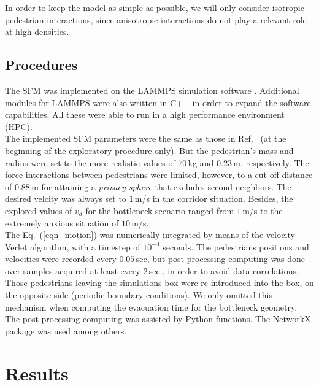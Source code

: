 \documentclass[preprint,12pt]{elsarticle}
\begin{document}
In order to keep the model as simple as possible, we will only consider
isotropic pedestrian interactions, since anisotropic interactions do not play a
relevant role at high densities. \\



\subsection{Procedures} 

The SFM was implemented on the LAMMPS simulation software \cite{plimpton}.
Additional modules for LAMMPS were also written in C++ in order to expand the
software capabilities. All these were able to run in a high performance
environment (HPC). \\


The implemented SFM parameters were the same as those in
Ref.~\cite{helbing_2000} (at the beginning of the exploratory procedure only).
But the pedestrian's mass and radius were set to the more realistic values of
$70\,$kg and $0.23\,$m, respectively. The force interactions between
pedestrians were limited, however, to a cut-off distance of $0.88\,$m for
attaining a \textit{privacy sphere} that excludes second neighbors. The desired
velcity was always set to $1\,$m/s in the corridor situation. Besides, the
explored values of $v_d$ for the bottleneck scenario ranged from $1\,$m/s to the
extremely anxious situation of $10\,$m/s. \\


The Eq.~(\ref{eqn_motion}) was numerically integrated by means of the velocity
Verlet algorithm, with a timestep of $10^{-4}$ seconds. The pedestrians
positions and velocities were recorded every $0.05\,$sec, but post-processing
computing was done over samples acquired at least every $2\,$sec., in order to
avoid  data correlations. Those pedestrians leaving the simulations box were
re-introduced into the box, on the opposite side (periodic boundary
conditions). We only omitted this mechanism when computing the evacuation time
for the bottleneck geometry. \\


The post-processing computing was assisted by Python functions. The NetworkX
package was used among others.   \\



\section{\label{results}Results}
\end{document}
